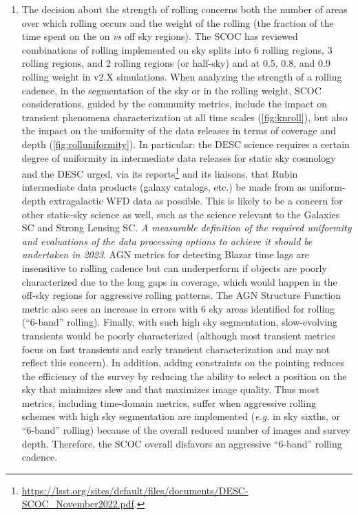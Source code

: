 \begin{enumerate}
 \item The decision about the strength of rolling concerns both the number of areas over which rolling occurs and the weight of the rolling (the fraction of the time spent on the on \emph{vs} off sky regions).  The SCOC has reviewed combinations of rolling implemented on sky splits into 6 rolling regions, 3 rolling regions, and 2 rolling regions (or half-sky) and at 0.5, 0.8, and 0.9 rolling weight in v2.X simulations. When analyzing the strength of a rolling cadence, in the segmentation of the sky or in the rolling weight, SCOC considerations, guided by the community metrics, include the impact on transient phenomena characterization at all time scales (\autoref{fig:knroll}), but also the impact on the uniformity of the data releases in terms of coverage and depth (\autoref{fig:rolluniformity}). In particular: the DESC science requires a certain degree of uniformity in intermediate data releases for static sky cosmology and the DESC urged, via its reports\footnote{\label{fn:descreport}\url{https://lsst.org/sites/default/files/documents/DESC-SCOC_November2022.pdf}.} and its liaisons, that Rubin intermediate data products (galaxy catalogs, etc.) be made from as uniform-depth extragalactic WFD data as possible. This is likely to be a concern for other static-sky science as well, such as the science relevant to the Galaxies SC and Strong Lensing SC. \emph{A measurable definition of the required uniformity and evaluations of the data processing options to achieve it should be undertaken in 2023}. AGN metrics for detecting Blazar time lags are insensitive to rolling cadence but can underperform if objects are poorly characterized due to the long gaps in coverage, which would happen in the off-sky regions for aggressive rolling patterns. The AGN Structure Function metric also sees an increase in errors with 6 sky areas identified for rolling (``6-band'' rolling). Finally, with such high sky segmentation, slow-evolving transients would be poorly characterized (although most transient metrics focus on fast transients and early transient characterization and may not reflect this concern). In addition, adding constraints on the pointing reduces the efficiency of the survey by reducing the ability to select a position on the sky that minimizes slew and that maximizes image quality. Thus most metrics, including time-domain metrics, suffer when aggressive rolling schemes with high sky segmentation are implemented (\emph{e.g.} in sky sixths, or ``6-band'' rolling) because of the overall reduced number of images and survey depth. Therefore, the SCOC overall disfavors an aggressive ``6-band'' rolling cadence.

\end{enumerate}
